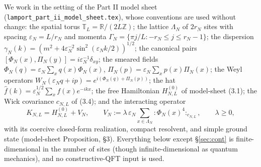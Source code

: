 \documentclass[11pt,a4paper]{article}
\theoremstyle{plain}
\theoremstyle{definition}
\newcommand{\R}{\mathbb{R}}
\newcommand{\Z}{\mathbb{Z}}
\newcommand{\T}{\mathbb{T}}
\newcommand{\eps}{\varepsilon}
\begin{document}
We work in the setting of the Part II model sheet
(\texttt{lamport\_part\_ii\_}\allowbreak\texttt{model\_sheet.tex}), whose
conventions are used without change: the spatial torus $\T_L=\R/(2L\Z)$; the
lattice $\Lambda_N$ of $2r_N$ sites with spacing $\eps_N=L/r_N$ and momenta
$\Gamma_N=\{\pi j/L:-r_N\le j\le r_N-1\}$; the dispersion
$\gamma_N(k)=(m^2+4\eps_N^{-2}\sin^2(\eps_Nk/2))^{1/2}$; the canonical pairs
$[\Phi_N(x),\Pi_N(y)]=i\eps_N^{-1}\delta_{xy}$; the smeared fields
$\Phi_N(q)=\eps_N\sum_xq(x)\Phi_N(x)$, $\Pi_N(p)=\eps_N\sum_xp(x)\Pi_N(x)$; the
Weyl operators $W_N(\eps_Nq+ip)=e^{i(\Phi_N(q)+\Pi_N(p))}$; the hat
$\widehat f(k)=\eps_N^{1/2}\sum_xf(x)e^{-ikx}$; the free Hamiltonian
$H^{(0)}_{N,L}$ of model-sheet (3.1); the Wick covariance $c_{N,L}$ of (3.4);
and the interacting operator
\[
 K_{N,L}=H^{(0)}_{N,L}+V_N,\qquad
 V_N:=\lambda\,\eps_N\!\!\sum_{x\in\Lambda_N}\!
 {:}\Phi_N(x)^4{:}_{c_{N,L}},\qquad\lambda\ge0,
\]
with its coercive closed-form realization, compact resolvent, and simple ground
state (model-sheet Proposition, \S3). Everything below except \S\ref{sec:cont}
is finite-dimensional in the number of sites (though infinite-dimensional as
quantum mechanics), and no constructive-QFT input is used.
\end{document}
